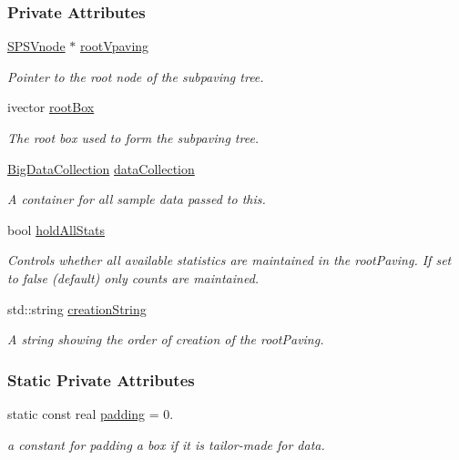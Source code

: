 \subsubsection*{\-Private \-Attributes}
\begin{DoxyCompactItemize}
\item 
\hyperlink{classsubpavings_1_1SPSVnode}{\-S\-P\-S\-Vnode} $\ast$ \hyperlink{classsubpavings_1_1AdaptiveHistogramValidation_a811e21423987027452237cabf38c008c}{root\-Vpaving}
\begin{DoxyCompactList}\small\item\em \-Pointer to the root node of the subpaving tree. \end{DoxyCompactList}\item 
ivector \hyperlink{classsubpavings_1_1AdaptiveHistogramValidation_aa8a961766f97013134d73f1735f3516c}{root\-Box}
\begin{DoxyCompactList}\small\item\em \-The root box used to form the subpaving tree. \end{DoxyCompactList}\item 
\hyperlink{namespacesubpavings_aa79f33663da92502ce1a37f3fd1f3d85}{\-Big\-Data\-Collection} \hyperlink{classsubpavings_1_1AdaptiveHistogramValidation_acae18e51a5026807492d2109702c3c93}{data\-Collection}
\begin{DoxyCompactList}\small\item\em \-A container for all sample data passed to this. \end{DoxyCompactList}\item 
bool \hyperlink{classsubpavings_1_1AdaptiveHistogramValidation_a4de24d08db784df2fdb619ba2c1f62fd}{hold\-All\-Stats}
\begin{DoxyCompactList}\small\item\em \-Controls whether all available statistics are maintained in the root\-Paving. \-If set to false (default) only counts are maintained. \end{DoxyCompactList}\item 
std\-::string \hyperlink{classsubpavings_1_1AdaptiveHistogramValidation_a7d46cc6c04481f9579e9f5238ccea8b2}{creation\-String}
\begin{DoxyCompactList}\small\item\em \-A string showing the order of creation of the root\-Paving. \end{DoxyCompactList}\end{DoxyCompactItemize}
\subsubsection*{\-Static \-Private \-Attributes}
\begin{DoxyCompactItemize}
\item 
static const real \hyperlink{classsubpavings_1_1AdaptiveHistogramValidation_a0039bec0f033c35a5477375cb54eb8ea}{padding} = 0.
\begin{DoxyCompactList}\small\item\em a constant for padding a box if it is tailor-\/made for data. \end{DoxyCompactList}\end{DoxyCompactItemize}


